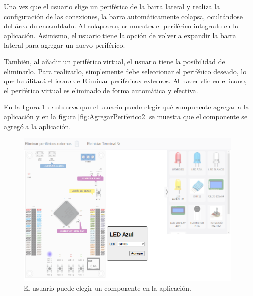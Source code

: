 Una vez que el usuario elige un periférico de la barra lateral y realiza la configuración de las conexiones, la barra automáticamente colapsa, ocultándose del área de ensamblado. Al colapsarse, se muestra el periférico integrado en la aplicación. Asimismo,  el usuario tiene la opción de volver a expandir la barra lateral para agregar un nuevo periférico.

También, al añadir un periférico virtual, el usuario tiene la posibilidad de eliminarlo. Para realizarlo, simplemente debe seleccionar el periférico deseado, lo que habilitará el icono de \textquotedbl Eliminar periféricos externos\textquotedbl. Al hacer clic en el icono, el periférico virtual es eliminado de forma automática y efectiva.


En la figura \ref{fig:AgregarPeriferico} se observa que el usuario puede elegir qué componente agregar a la aplicación y en la figura \ref{fig:AgregarPeriferico2} se muestra que el componente se agregó a la aplicación.


\begin{figure}[ht]
	\centering
	\includegraphics[scale=.37]{./Figures/AgregarPeriferico.png}
	\caption{El usuario puede elegir un componente en la aplicación.}
	\label{fig:AgregarPeriferico}
\end{figure}


